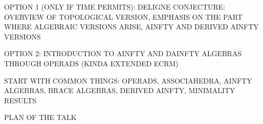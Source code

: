 \documentclass{beamer}
\title{}
\author{Javier Aguilar Mart\'in}
\institute{University of Kent}
\date{}
\theoremstyle{definition}
\begin{document}
\frame{\titlepage}


\begin{frame}
OPTION 1 (ONLY IF TIME PERMITS):
DELIGNE CONJECTURE: OVERVIEW OF TOPOLOGICAL VERSION, EMPHASIS ON THE PART WHERE ALGEBRAIC VERSIONS ARISE, AINFTY AND DERIVED AINFTY VERSIONS

OPTION 2:
INTRODUCTION TO AINFTY AND DAINFTY ALGEBRAS THROUGH OPERADS (KINDA EXTENDED ECRM)

START WITH COMMON THINGS: OPERADS, ASSOCIAHEDRA, AINFTY ALGEBRAS, BRACE ALGEBRAS, DERIVED AINFTY, MINIMALITY RESULTS


\end{frame}

\begin{frame}
PLAN OF THE TALK
\end{frame}
\end{document}
